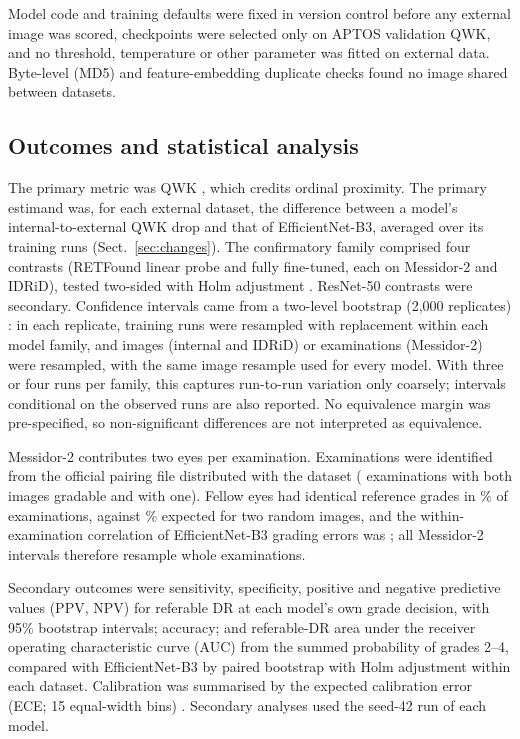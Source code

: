 \documentclass[pdflatex,sn-basic,Numbered]{sn-jnl}
\begin{document}
Model code and training defaults were fixed in version control before any external image was scored, checkpoints were selected only on APTOS validation QWK, and no threshold, temperature or other parameter was fitted on external data. Byte-level (MD5) and feature-embedding duplicate checks found no image shared between datasets.

\subsection{Outcomes and statistical analysis}\label{sec:stats}

The primary metric was QWK \cite{cohen1968kappa}, which credits ordinal proximity. The primary estimand was, for each external dataset, the difference between a model's internal-to-external QWK drop and that of EfficientNet-B3, averaged over its training runs (Sect.~\ref{sec:changes}). The confirmatory family comprised four contrasts (RETFound linear probe and fully fine-tuned, each on Messidor-2 and IDRiD), tested two-sided with Holm adjustment \cite{holm1979}. ResNet-50 contrasts were secondary. Confidence intervals came from a two-level bootstrap (2,000 replicates) \cite{efron1994bootstrap}: in each replicate, training runs were resampled with replacement within each model family, and images (internal and IDRiD) or examinations (Messidor-2) were resampled, with the same image resample used for every model. With three or four runs per family, this captures run-to-run variation only coarsely; intervals conditional on the observed runs are also reported. No equivalence margin was pre-specified, so non-significant differences are not interpreted as equivalence.

Messidor-2 contributes two eyes per examination. Examinations were identified from the official pairing file distributed with the dataset ( examinations with both images gradable and  with one). Fellow eyes had identical reference grades in \% of examinations, against \% expected for two random images, and the within-examination correlation of EfficientNet-B3 grading errors was ; all Messidor-2 intervals therefore resample whole examinations.

Secondary outcomes were sensitivity, specificity, positive and negative predictive values (PPV, NPV) for referable DR at each model's own grade decision, with 95\% bootstrap intervals; accuracy; and referable-DR area under the receiver operating characteristic curve (AUC) from the summed probability of grades 2--4, compared with EfficientNet-B3 by paired bootstrap with Holm adjustment within each dataset. Calibration was summarised by the expected calibration error (ECE; 15 equal-width bins) \cite{guo2017calibration}. Secondary analyses used the seed-42 run of each model.
\end{document}

